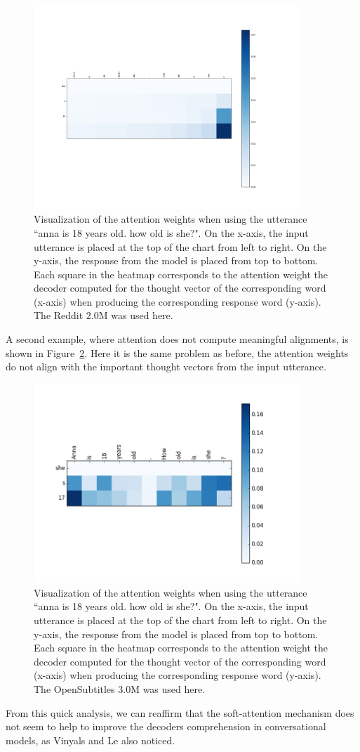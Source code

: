 \begin{figure}[h]
	\centering
	\includegraphics[width=10cm]{img/attention/attention_visualization3_reddit_2m.png}
	\caption{Visualization of the attention weights when using the utterance ``anna is 18 years old. how old is she?". On the x-axis, the input utterance is placed at the top of the chart from left to right. On the y-axis, the response from the model is placed from top to bottom. Each square in the heatmap corresponds to the attention weight the decoder computed for the thought vector of the corresponding word (x-axis) when producing the corresponding response word (y-axis). The Reddit 2.0M was used here.}
	\label{results:attention:example3:reddit}
\end{figure}

A second example, where attention does not compute meaningful alignments, is shown in Figure~\ref{results:attention:example3:opensubtitles-3M}. Here it is the same problem as before, the attention weights do not align with the important thought vectors from the input utterance.

\begin{figure}[h]
	\centering
	\includegraphics[width=10cm]{img/attention/attention_visualization3_OpenSubtitle-3M.png}
	\caption{Visualization of the attention weights when using the utterance ``anna is 18 years old. how old is she?". On the x-axis, the input utterance is placed at the top of the chart from left to right. On the y-axis, the response from the model is placed from top to bottom. Each square in the heatmap corresponds to the attention weight the decoder computed for the thought vector of the corresponding word (x-axis) when producing the corresponding response word (y-axis). The OpenSubtitles 3.0M was used here.}
	\label{results:attention:example3:opensubtitles-3M}
\end{figure}

From this quick analysis, we can reaffirm that the soft-attention mechanism does not seem to help to improve the decoders comprehension in conversational models, as Vinyals and Le also noticed.

